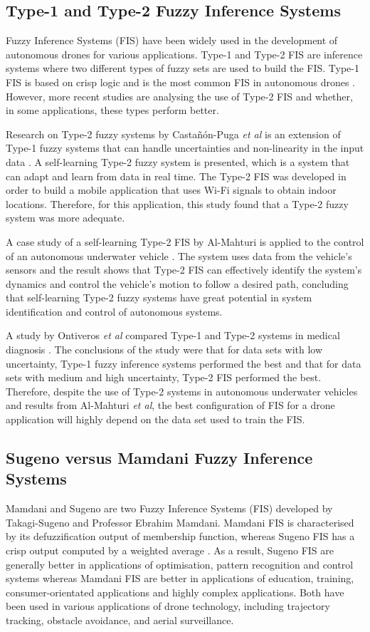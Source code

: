 \subsection{Type-1 and Type-2 Fuzzy Inference Systems} 
Fuzzy Inference Systems (FIS) have been widely used in the development of autonomous drones for various applications. Type-1 and Type-2 FIS are inference systems where two different types of fuzzy sets are used to build the FIS. Type-1 FIS is based on crisp logic and is the most common FIS in autonomous drones \cite{boxi8}. However, more recent studies are analysing the use of Type-2 FIS and whether, in some applications, these types perform better.

Research on Type-2 fuzzy systems by Castañón-Puga \textit{et al} is an extension of Type-1 fuzzy systems that can handle uncertainties and non-linearity in the input data \cite{boxi9}. A self-learning Type-2 fuzzy system is presented, which is a system that can adapt and learn from data in real time. The Type-2 FIS was developed in order to build a mobile application that uses Wi-Fi signals to obtain indoor locations. Therefore, for this application, this study found that a Type-2 fuzzy system was more adequate. 

A case study of a self-learning Type-2 FIS by Al-Mahturi is applied to the control of an autonomous underwater vehicle \cite{boxi10}. The system uses data from the vehicle’s sensors and the result shows that Type-2 FIS can effectively identify the system’s dynamics and control the vehicle’s motion to follow a desired path, concluding that self-learning Type-2 fuzzy systems have great potential in system identification and control of autonomous systems. 

A study by Ontiveros \textit{et al} compared Type-1 and Type-2 systems in medical diagnosis \cite{zain3}. The conclusions of the study were that for data sets with low uncertainty, Type-1 fuzzy inference systems performed the best and that for data sets with medium and high uncertainty, Type-2 FIS performed the best. Therefore, despite the use of Type-2 systems in autonomous underwater vehicles and results from Al-Mahturi \textit{et al}, the best configuration of FIS for a drone application will highly depend on the data set used to train the FIS. 

\subsection{Sugeno versus Mamdani Fuzzy Inference Systems} 
Mamdani and Sugeno are two Fuzzy Inference Systems (FIS) developed by Takagi-Sugeno and Professor Ebrahim Mamdani. Mamdani FIS is characterised by its defuzzification output of membership function, whereas Sugeno FIS has a crisp output computed by a weighted average \cite{boxi11}. As a result, Sugeno FIS are generally better in applications of optimisation, pattern recognition and control systems whereas Mamdani FIS are better in applications of education, training, consumer-orientated applications and highly complex applications. Both have been used in various applications of drone technology, including trajectory tracking, obstacle avoidance, and aerial surveillance.

